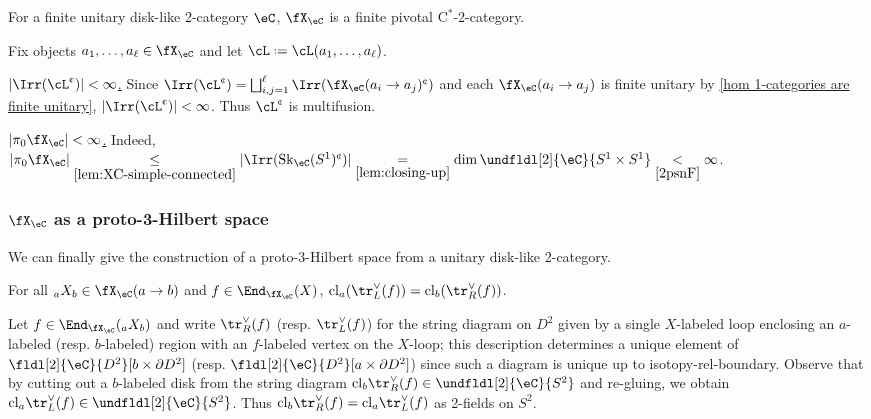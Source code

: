 \documentclass[12pt,reqno]{amsart}
\newcommand{\cl}{\mathrm{cl}}
\newcommand{\Sk}{\mathrm{Sk}}
\newcommand{\C}{\eC}
\newcommand{\Cstar}{\ensuremath{\mathrm{C}^{*}}}
\newcommand{\cent}{\textup{\textcent}}
\newcommand{\itemstep}[1]{\smallskip\noindent\underline{#1}}
\DeclareRobustCommand{\coloneq}{\mathrel{\vcenter{\baselineskip0.5ex\lineskiplimit0pt\hbox{\scriptsize{\upshape.}}\hbox{\scriptsize{\upshape.}}}}=}
\begin{document}
\begin{proposition}
\label{unitary implies finite unitary cylinder 2-categories}
For a finite unitary disk-like 2-category $\C$, $\fX_\C$ is a finite pivotal $\Cstar$-2-category.
\end{proposition}

\begin{pf}
  Fix objects $a_1,\dots,a_\ell\in\fX_\C$ and let $\cL\coloneq\cL(a_1,\dots,a_\ell)$.

  \itemstep{$|\Irr(\cL^\cent)|<\infty$.}
  Since $\Irr(\cL^\cent)=\bigsqcup_{i,j=1}^{\ell}\Irr(\fX_\C(a_i\to a_j)^\cent)$ and each $\fX_\C(a_i\to a_j)$ is finite unitary by \cref{hom 1-categories are finite unitary}, $|\Irr(\cL^\cent)|<\infty$. Thus $\cL^\cent$ is multifusion.

\itemstep{$|\pi_0\fX_\C|<\infty$.}
  Indeed, $|\pi_0\fX_\C|\underset{\eqref{lem:XC-simple-connected}}{\leq}|\Irr(\Sk_\C(S^1)^\cent)|\underset{\eqref{lem:closing-up}}{=}\dim\undfldl[2]{\C}{S^1\times S^1}\underset{\ref{2psnF}}{<}\infty$.
\end{pf}

\subsubsection{\texorpdfstring{$\fX_\C$}{X(C)} as a proto-3-Hilbert space}

We can finally give the construction of a proto-3-Hilbert space from a unitary disk-like 2-category.


\begin{lemma}
\label{cor:cl-slide}
For all ${}_aX_b\in\fX_\C(a\to b)$ and $f\in\End_{\fX_\C}(X)$, $\cl_a(\tr_L^\vee(f))=\cl_b(\tr_R^\vee(f))$.
\end{lemma}

\begin{pf}
Let $f\in\End_{\fX_\C}({}_aX_b)$ and write $\tr_R^\vee(f)$ (resp. $\tr_L^\vee(f)$) for the string diagram on $D^2$ given by a single $X$-labeled loop enclosing an $a$-labeled (resp. $b$-labeled) region with an $f$-labeled vertex on the $X$-loop; this description determines a unique element of $\fldl[2]{\C}{D^2}[b\times \partial D^2]$ (resp. $\fldl[2]{\C}{D^2}[a\times \partial D^2]$) since such a diagram is unique up to isotopy-rel-boundary. Observe that by cutting out a $b$-labeled disk from the string diagram $\cl_b\tr_R^\vee(f)\in\undfldl[2]{\C}{S^2}$ and re-gluing, we obtain $\cl_a\tr_L^\vee(f)\in\undfldl[2]{\C}{S^2}$. Thus $\cl_b\tr_R^\vee(f)=\cl_a\tr_L^\vee(f)$ as 2-fields on $S^2$.
\end{pf}
\end{document}
